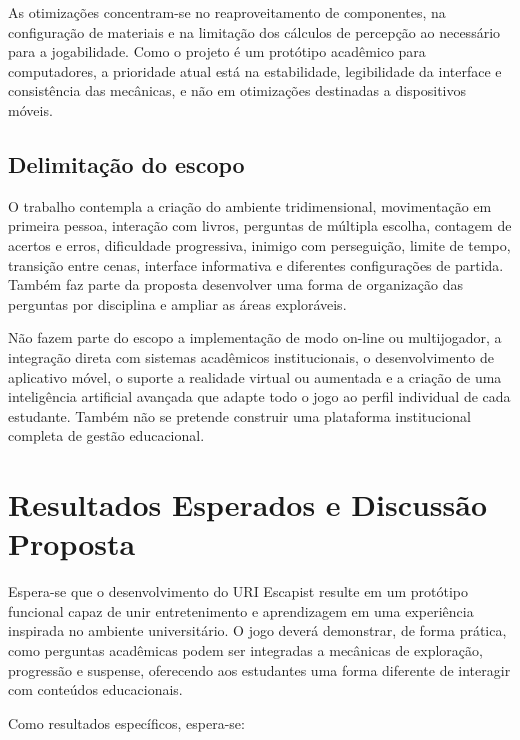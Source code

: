 \documentclass[12pt]{article}
\begin{document}
As otimizações concentram-se no reaproveitamento de componentes, na configuração de materiais e na limitação dos cálculos de percepção ao necessário para a jogabilidade. Como o projeto é um protótipo acadêmico para computadores, a prioridade atual está na estabilidade, legibilidade da interface e consistência das mecânicas, e não em otimizações destinadas a dispositivos móveis.

\subsection{Delimitação do escopo}

O trabalho contempla a criação do ambiente tridimensional, movimentação em primeira pessoa, interação com livros, perguntas de múltipla escolha, contagem de acertos e erros, dificuldade progressiva, inimigo com perseguição, limite de tempo, transição entre cenas, interface informativa e diferentes configurações de partida. Também faz parte da proposta desenvolver uma forma de organização das perguntas por disciplina e ampliar as áreas exploráveis.

Não fazem parte do escopo a implementação de modo on-line ou multijogador, a integração direta com sistemas acadêmicos institucionais, o desenvolvimento de aplicativo móvel, o suporte a realidade virtual ou aumentada e a criação de uma inteligência artificial avançada que adapte todo o jogo ao perfil individual de cada estudante. Também não se pretende construir uma plataforma institucional completa de gestão educacional.

\section{Resultados Esperados e Discussão Proposta}

Espera-se que o desenvolvimento do URI Escapist resulte em um protótipo funcional capaz de unir entretenimento e aprendizagem em uma experiência inspirada no ambiente universitário. O jogo deverá demonstrar, de forma prática, como perguntas acadêmicas podem ser integradas a mecânicas de exploração, progressão e suspense, oferecendo aos estudantes uma forma diferente de interagir com conteúdos educacionais.

Como resultados específicos, espera-se:
\end{document}
